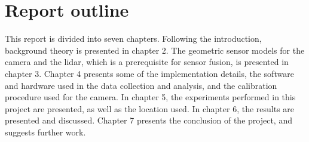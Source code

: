 \section{Report outline}
This report is divided into seven chapters. Following the introduction, background theory is presented in chapter 2. The geometric sensor models for the camera and the lidar, which is a prerequisite for sensor fusion, is presented in chapter 3. Chapter 4 presents some of the implementation details, the software and hardware used in the data collection and analysis, and the calibration procedure used for the camera. In chapter 5, the experiments performed in this project are presented, as well as the location used. In chapter 6, the results are presented and discussed. Chapter 7 presents the conclusion of the project, and suggests further work.

\cleardoublepage